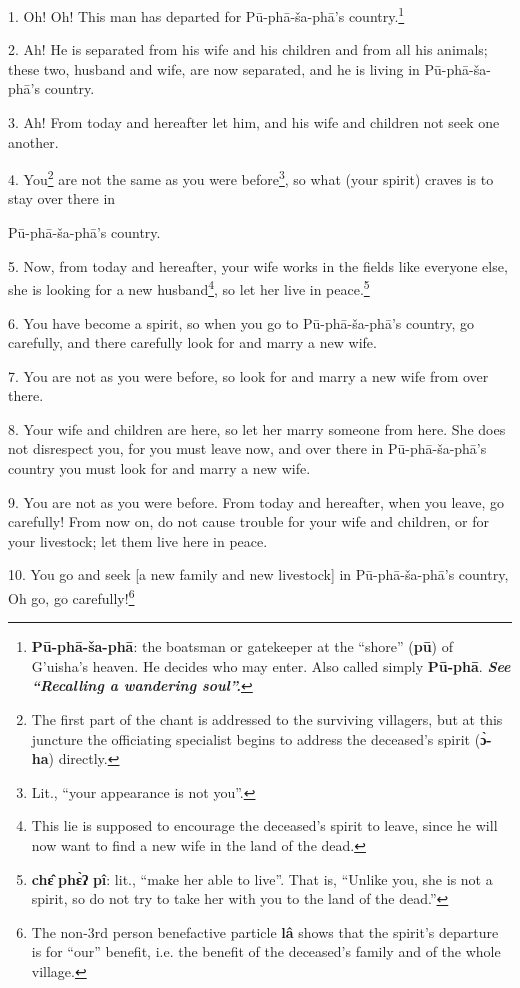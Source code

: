 \setcounter{footnote}{0}

1. Oh! Oh! This man has departed for Pū-phā-ša-phā's country.\footnote{\textbf{Pū-phā-ša-phā}: the boatsman or gatekeeper at the ``shore'' (\textbf{pū}) of G'uisha's heaven. He decides who may enter. Also called simply \textbf{Pū-phā}. \textit{\textbf{See ``Recalling a wandering soul''.}}}

2. Ah! He is separated from his wife and his children and from all his animals;
these two, husband and wife, are now separated, and he is living in Pū-phā-ša-phā's
country.

3. Ah! From today and hereafter let him, and his wife and children not seek one
another.

4. You\footnote{The first part of the chant is addressed to the surviving villagers, but at this juncture the officiating specialist begins to address the deceased's spirit (\textbf{ɔ̀-ha}) directly.} are not the same as you were before\footnote{Lit., ``your appearance is not you''.}, so what (your spirit) craves
is to stay over there in

Pū-phā-ša-phā's country.

5. Now, from today and hereafter, your wife works in the fields like everyone else,
she is looking for a new husband\footnote{This lie is supposed to encourage the deceased's spirit to leave, since he will now want to find a new wife in the land of the dead.}, so let her live in peace.\footnote{\textbf{chɛ̂} \textbf{phɛ̀ʔ} \textbf{pî}: lit., ``make her able to live''. That is, ``Unlike you, she is not a spirit, so do not try to take her with you to the land of the dead.''}

6. You have become a spirit, so when you go to Pū-phā-ša-phā's country, go
carefully, and there carefully look for and marry a new wife.

7. You are not as you were before, so look for and marry a new wife from over there.

8. Your wife and children are here, so let her marry someone from here. She does
not disrespect you, for you must leave now, and over there in Pū-phā-ša-phā's
country you must look for and marry a new wife.

9. You are not as you were before. From today and hereafter, when you leave, go
carefully! From now on, do not cause trouble for your wife and children, or for
your livestock; let them live here in peace.

10. You go and seek [a new family and new livestock] in Pū-phā-ša-phā's country,
Oh go, go carefully!\footnote{The non-3rd person benefactive particle \textbf{lâ} shows that the spirit's departure is for ``our'' benefit, i.e. the benefit of the deceased's family and of the whole village.}

